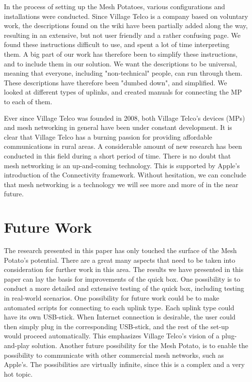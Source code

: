 In the process of setting up the Mesh Potatoes, various configurations and installations were conducted. Since Village Telco is a company based on voluntary work, the descriptions found on the wiki have been partially added along the way, resulting in an extensive, but not user friendly and a rather confusing page. We found these instructions difficult to use, and spent a lot of time interpreting them. A big part of our work has therefore been to simplify these instructions, and to include them in our solution. We want the descriptions to be universal, meaning that everyone, including "non-technical" people, can run through them. These descriptions have therefore been "dumbed down", and simplified. We looked at different types of uplinks, and created manuals for connecting the MP to each of them. 

Ever since Village Telco was founded in 2008, both Village Telco's devices (MPs) and mesh networking in general have been under constant development. It is clear that Village Telco has a burning passion for providing affordable communications in rural areas. A considerable amount of new research has been conducted in this field during a short period of time. There is no doubt that mesh networking is an up-and-coming technology. This is supported by Apple's introduction of the Connectivity framework. Without hesitation, we can conclude that mesh networking is a technology we will see more and more of in the near future.  

\section{Future Work}
The research presented in this paper has only touched the surface of the Mesh Potato's potential. There are a great many aspects that need to be taken into consideration for further work in this area. The results we have presented in this paper can lay the basis for improvements of the \gls{quick} box. One possibility is to conduct a more detailed and extensive testing of the \gls{quick} box, including testing in real-world scenarios. One possibility for future work could be to make automated scripts for connecting to each uplink type. Each uplink type could have its own USB-stick. When Internet connection is desirable, the user could then simply plug in the corresponding USB-stick, and the rest of the set-up would proceed automatically. This emphasizes Village Telco's vision of a plug-and-play solution. Another future possibility for the Mesh Potato, is to enable the possibility to communicate with other commercial mesh networks, such as Apple's. The possibilities are virtually infinite, since this is a complex and a very hot topic.

